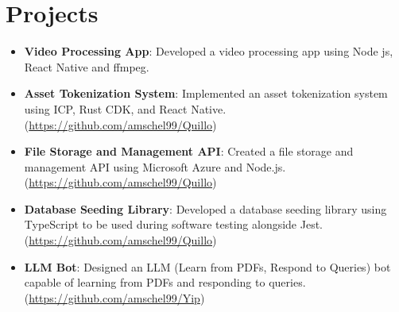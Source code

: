 \documentclass[letterpaper,11pt]{article}
\newcommand{\resumeItem}[2]{
  \item\small{
    \textbf{#1}{: #2 \vspace{-2pt}}
  }
}
\newcommand{\resumeSubHeadingListStart}{\begin{itemize}[leftmargin=*]}
\newcommand{\resumeSubHeadingListEnd}{\end{itemize}}
\begin{document}
\section{Projects}
\resumeSubHeadingListStart
\resumeItem{Video Processing App}
{Developed a video processing app using Node js, React Native and ffmpeg.}
\resumeItem{Asset Tokenization System}
{Implemented an asset tokenization system using ICP, Rust CDK, and React Native. (\href{https://github.com/amschel99/Quillo}{https://github.com/amschel99/Quillo})}

\resumeItem{File Storage and Management API}
{Created a file storage and management API using Microsoft Azure and Node.js.(\href{https://github.com/amschel99/veestream}{https://github.com/amschel99/Quillo})}
\resumeItem{Database Seeding Library}
{Developed a database seeding library using TypeScript to be used during software testing alongside Jest.(\href{https://github.com/amschel99/quick-mongo-seed}{https://github.com/amschel99/Quillo})}
\resumeItem{LLM Bot}
{Designed an LLM (Learn from PDFs, Respond to Queries) bot capable of learning from PDFs and responding to queries.(\href{https://github.com/amschel99/Yip}{https://github.com/amschel99/Yip})}
\resumeSubHeadingListEnd

\end{document}
